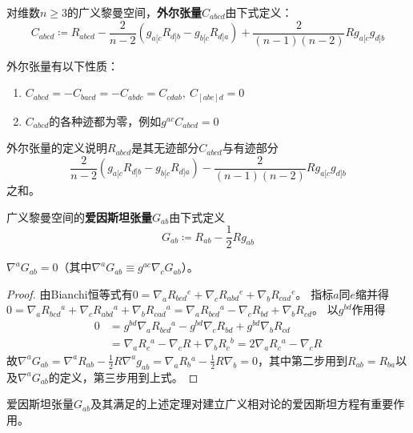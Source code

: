 \begin{definition}
对维数$n \geq 3$的广义黎曼空间，\textbf{外尔张量}$C_{abcd}$由下式定义：
$$C_{abcd} \coloneq R_{abcd} - \frac{2}{n - 2}(g_{a[c}R_{d]b} - g_{b[c}R_{d]a}) + \frac{2}{(n - 1)(n - 2)}Rg_{a[c}g_{d]b}$$
\end{definition}

\begin{theorem}
外尔张量有以下性质：
\begin{enumerate}[（1）]
\item $C_{abcd} = -C_{bacd} = -C_{abdc} = C_{cdab}, ~ C_{[abc]d} = 0$
\item $C_{abcd}$的各种迹都为零，例如$g^{ac}C_{abcd} = 0$
\end{enumerate}
\end{theorem}

\begin{note}
外尔张量的定义说明$R_{abcd}$是其无迹部分$C_{abcd}$与有迹部分
$$\frac{2}{n - 2}(g_{a[c}R_{d]b} - g_{b[c}R_{d]a}) - \frac{2}{(n - 1)(n - 2)}Rg_{a[c}g_{d]b}$$
之和。
\end{note}

\begin{definition}
广义黎曼空间的\textbf{爱因斯坦张量}$G_{ab}$由下式定义
$$G_{ab} \coloneq R_{ab} - \frac{1}{2}Rg_{ab}$$
\end{definition}

\begin{theorem}
$\nabla^aG_{ab} = 0$（其中$\nabla^aG_{ab} \equiv g^{ac}\nabla_cG_{ab}$）。
\end{theorem}

\begin{proof}
由Bianchi恒等式有$0 = \nabla_aR_{bcd}{}^e + \nabla_cR_{abd}{}^e + \nabla_bR_{cad}{}^e$。
指标$a$同$e$缩并得$0 = \nabla_aR_{bcd}{}^a + \nabla_cR_{abd}{}^a + \nabla_bR_{cad}{}^a = \nabla_aR_{bcd}{}^a - \nabla_cR_{bd} + \nabla_bR_{cd}$。
以$g^{bd}$作用得
$$\begin{aligned}
0 & = g^{bd}\nabla_aR_{bcd}{}^a - g^{bd}\nabla_cR_{bd} + g^{bd}\nabla_bR_{cd} \\
& = \nabla_aR_{c}{}^a - \nabla_cR + \nabla_bR_c{}^b = 2\nabla_aR_c{}^a - \nabla_cR
\end{aligned}$$
故$\nabla^aG_{ab} = \nabla^aR_{ab} - \frac{1}{2}R\nabla^ag_{ab} = \nabla_aR_{b}{}^a - \frac{1}{2}R\nabla_b = 0$，其中第二步用到$R_{ab} = R_{ba}$以及$\nabla^aG_{ab}$的定义，第三步用到上式。
\end{proof}

爱因斯坦张量$G_{ab}$及其满足的上述定理对建立广义相对论的爱因斯坦方程有重要作用。


